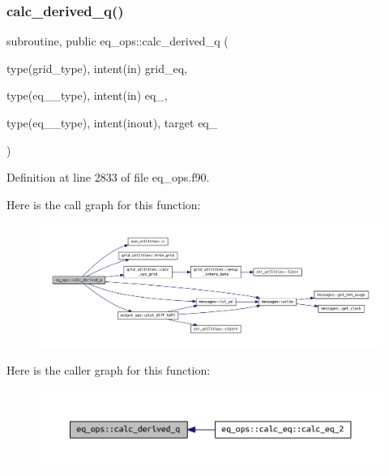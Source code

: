 \subsubsection{\texorpdfstring{calc\+\_\+derived\+\_\+q()}{calc\_derived\_q()}}
{\footnotesize\ttfamily subroutine, public eq\+\_\+ops\+::calc\+\_\+derived\+\_\+q (\begin{DoxyParamCaption}\item[{type(grid\+\_\+type), intent(in)}]{grid\+\_\+eq,  }\item[{type(eq\+\_\+1\+\_\+type), intent(in)}]{eq\+\_,  }\item[{type(eq\+\_\+2\+\_\+type), intent(inout), target}]{eq\+\_ }\end{DoxyParamCaption})}



Definition at line 2833 of file eq\+\_\+ops.\+f90.

Here is the call graph for this function\+:
\nopagebreak
\begin{figure}[H]
\begin{center}
\leavevmode
\includegraphics[width=350pt]{namespaceeq__ops_a8f774acd7a5af5e9ca315907e3d7a885_cgraph}
\end{center}
\end{figure}
Here is the caller graph for this function\+:
\nopagebreak
\begin{figure}[H]
\begin{center}
\leavevmode
\includegraphics[width=350pt]{namespaceeq__ops_a8f774acd7a5af5e9ca315907e3d7a885_icgraph}
\end{center}
\end{figure}
\mbox{\label{namespaceeq__ops_a91256e08dadab2ccbabd66cf369c43a5}} 
